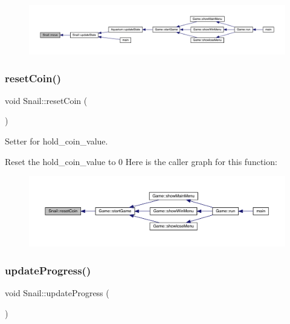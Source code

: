 \nopagebreak
\begin{figure}[H]
\begin{center}
\leavevmode
\includegraphics[width=350pt]{class_snail_af5892ec122d9199480c813b74488256b_icgraph}
\end{center}
\end{figure}
\mbox{\label{class_snail_a21ebc352e8884cd36a1733aafb731944}} 
\subsubsection{\texorpdfstring{reset\+Coin()}{resetCoin()}}
{\footnotesize\ttfamily void Snail\+::reset\+Coin (\begin{DoxyParamCaption}{ }\end{DoxyParamCaption})}



Setter for hold\+\_\+coin\+\_\+value. 

Reset the hold\+\_\+coin\+\_\+value to 0 Here is the caller graph for this function\+:
\nopagebreak
\begin{figure}[H]
\begin{center}
\leavevmode
\includegraphics[width=350pt]{class_snail_a21ebc352e8884cd36a1733aafb731944_icgraph}
\end{center}
\end{figure}
\mbox{\label{class_snail_a327c2d31017320c4cd18b48103905fa7}} 
\subsubsection{\texorpdfstring{update\+Progress()}{updateProgress()}}
{\footnotesize\ttfamily void Snail\+::update\+Progress (\begin{DoxyParamCaption}{ }\end{DoxyParamCaption})\hspace{0.3cm}{\ttfamily [virtual]}}



